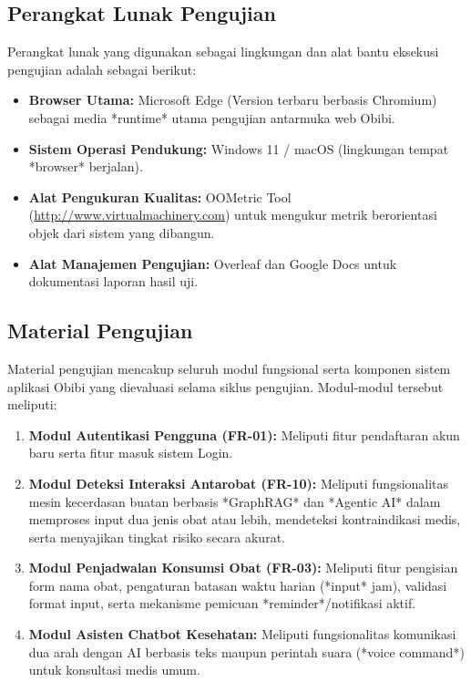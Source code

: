 \documentclass[12pt, a4paper]{article}
\begin{document}
\subsection{Perangkat Lunak Pengujian}

Perangkat lunak yang digunakan sebagai lingkungan dan alat bantu eksekusi pengujian adalah sebagai berikut:
\begin{itemize}[leftmargin=2em]
  \item \textbf{Browser Utama:} Microsoft Edge (Version terbaru berbasis Chromium) sebagai media *runtime* utama pengujian antarmuka web Obibi.
  \item \textbf{Sistem Operasi Pendukung:} Windows 11 / macOS (lingkungan tempat *browser* berjalan).
  \item \textbf{Alat Pengukuran Kualitas:} OOMetric Tool (\url{http://www.virtualmachinery.com}) untuk mengukur metrik berorientasi objek dari sistem yang dibangun.
  \item \textbf{Alat Manajemen Pengujian:} Overleaf dan Google Docs untuk dokumentasi laporan hasil uji.
\end{itemize}

\subsection{Material Pengujian}

Material pengujian mencakup seluruh modul fungsional serta komponen sistem aplikasi Obibi yang dievaluasi selama siklus pengujian. Modul-modul tersebut meliputi:
\begin{enumerate}[leftmargin=2em]
  \item \textbf{Modul Autentikasi Pengguna (FR-01):} Meliputi fitur pendaftaran akun baru serta fitur masuk sistem Login.
  \item \textbf{Modul Deteksi Interaksi Antarobat (FR-10):} Meliputi fungsionalitas mesin kecerdasan buatan berbasis *GraphRAG* dan *Agentic AI* dalam memproses input dua jenis obat atau lebih, mendeteksi kontraindikasi medis, serta menyajikan tingkat risiko secara akurat.
  \item \textbf{Modul Penjadwalan Konsumsi Obat (FR-03):} Meliputi fitur pengisian form nama obat, pengaturan batasan waktu harian (*input* jam), validasi format input, serta mekanisme pemicuan *reminder*/notifikasi aktif.
  \item \textbf{Modul Asisten Chatbot Kesehatan:} Meliputi fungsionalitas komunikasi dua arah dengan AI berbasis teks maupun perintah suara (*voice command*) untuk konsultasi medis umum.
\end{enumerate}
\end{document}
